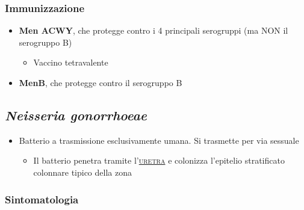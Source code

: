 \documentclass[italian,]{article}
\providecommand{\tightlist}{%
  \setlength{\itemsep}{0pt}\setlength{\parskip}{0pt}}
\renewcommand{\a}[1]{\underline{\textsc{#1}}}
\begin{document}
\hypertarget{immunizzazione}{%
\subsubsection{Immunizzazione}\label{immunizzazione}}

\begin{itemize}
\tightlist
\item
  \textbf{Men ACWY}, che protegge contro i 4 principali serogruppi (ma
  NON il serogruppo B)

  \begin{itemize}
  \tightlist
  \item
    Vaccino tetravalente
  \end{itemize}
\item
  \textbf{MenB}, che protegge contro il serogruppo B
\end{itemize}

\hypertarget{neisseria-gonorrhoeae}{%
\subsection{\texorpdfstring{\emph{Neisseria
gonorrhoeae}}{Neisseria gonorrhoeae}}\label{neisseria-gonorrhoeae}}

\begin{itemize}
\tightlist
\item
  Batterio a trasmissione esclusivamente umana. Si trasmette per via
  sessuale

  \begin{itemize}
  \tightlist
  \item
    Il batterio penetra tramite l'\a{uretra} e colonizza l'epitelio
    stratificato colonnare tipico della zona
  \end{itemize}
\end{itemize}

\hypertarget{sintomatologia}{%
\subsubsection{Sintomatologia}\label{sintomatologia}}
\end{document}
